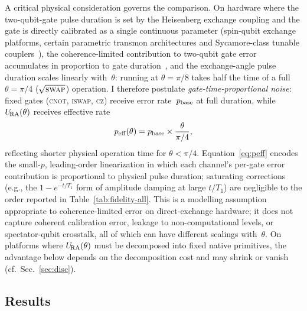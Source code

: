 A critical physical consideration governs the comparison.
On hardware where the two-qubit-gate pulse duration is set by the
Heisenberg exchange coupling and the gate is directly calibrated as a single continuous parameter (spin-qubit exchange platforms, certain parametric transmon architectures and Sycamore-class tunable couplers~\cite{LossDiVincenzo1998,Caldwell2018,Foxen2020,Abrams2020}), the coherence-limited contribution to two-qubit gate error accumulates in
proportion to gate duration~\cite{Krantz2019}, and the
exchange-angle pulse duration scales linearly with~$\theta$: running at
$\theta = \pi/8$ takes half the time of a full $\theta = \pi/4$
($\sqrt{\textsc{swap}}$) operation.
I therefore postulate \emph{gate-time-proportional noise}: fixed gates
(\textsc{cnot}, \textsc{iswap}, \textsc{cz}) receive error rate~$p_{\rm base}$
at full duration, while $U_{\!\mathrm{RA}}(\theta)$ receives effective rate
\begin{equation}
  p_{\rm eff}(\theta) = p_{\rm base} \times \frac{\theta}{\pi/4},
  \label{eq:peff}
\end{equation}
reflecting shorter physical operation time for $\theta < \pi/4$.
Equation~\eqref{eq:peff} encodes the small-$p$, leading-order
linearization in which each channel's per-gate error contribution is
proportional to physical pulse duration; saturating corrections
(e.g., the $1 - e^{-t/T_1}$ form of amplitude damping at large
$t/T_1$) are negligible to the order reported in
Table~\ref{tab:fidelity-all}.
This is a modelling assumption appropriate to coherence-limited error on
direct-exchange hardware; it does not capture coherent calibration
error, leakage to non-computational levels, or spectator-qubit
crosstalk, all of which can have different scalings with~$\theta$.
On platforms where $U_{\!\mathrm{RA}}(\theta)$ must be decomposed into fixed native
primitives, the advantage below depends on the decomposition cost and
may shrink or vanish (cf.\ Sec.~\ref{sec:disc}).

\subsection{Results}

